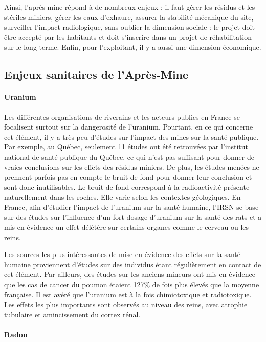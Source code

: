 \documentclass{article}
\begin{document}
Ainsi, l’après-mine répond à de nombreux enjeux : il faut gérer les résidus et les stériles miniers, gérer les eaux d’exhaure, assurer la stabilité mécanique du site, surveiller l’impact radiologique, sans oublier la dimension sociale : le projet doit être accepté par les habitants et doit s’inscrire dans un projet de réhabilitation sur le long terme. Enfin, pour l’exploitant, il y a aussi une dimension économique.

\subsection{Enjeux sanitaires de l’Après-Mine}
\paragraph{Uranium}

Les différentes organisations de riverains et les acteurs publics en France se focalisent surtout sur la dangerosité de l’uranium. Pourtant, en ce qui concerne cet élément, il y a très peu d'études sur l’impact des mines sur la santé publique. Par exemple, au Québec, seulement 11 études ont été retrouvées par l’institut national de santé publique du Québec, ce qui n’est pas suffisant pour donner de vraies conclusions sur les effets des résidus miniers. De plus, les études menées ne prennent parfois pas en compte le bruit de fond pour donner leur conclusion et sont donc inutilisables. Le bruit de fond correspond à la radioactivité présente naturellement dans les roches. Elle varie selon les contextes géologiques. En France, afin d’étudier l’impact de l’uranium sur la santé humaine, l’IRSN se base sur des études sur l’influence d’un fort dosage d’uranium sur la santé des rats et a mis en évidence un effet délétère sur certains organes comme le cerveau ou les reins. 


Les sources les plus intéressantes de mise en évidence des effets sur la santé humaine proviennent d'études sur des individus étant régulièrement en contact de cet élément. Par ailleurs, des études sur les anciens mineurs ont mis en évidence que les cas de cancer du poumon étaient 127\% de fois plus élevés que la moyenne française. 
Il est avéré que l'uranium est à la fois chimiotoxique et radiotoxique. Les effets les plus importants sont observés au niveau des reins, avec atrophie tubulaire et amincissement du cortex rénal.

\paragraph{Radon}
\end{document}
